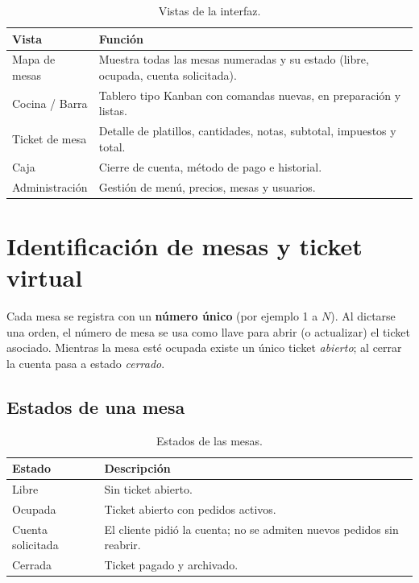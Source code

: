 \documentclass[11pt,letterpaper]{article}
\newcommand{\tabhead}[1]{\textbf{\color{white}#1}}
\newcommand{\encabezado}{\rowcolor{azulprincipal}}
\begin{document}
\begin{table}[h!]
\centering
\begin{tabularx}{\textwidth}{l X}
\toprule
\encabezado \tabhead{Vista} & \tabhead{Función} \\
\midrule
Mapa de mesas & Muestra todas las mesas numeradas y su estado (libre, ocupada, cuenta solicitada). \\
Cocina / Barra & Tablero tipo Kanban con comandas nuevas, en preparación y listas. \\
Ticket de mesa & Detalle de platillos, cantidades, notas, subtotal, impuestos y total. \\
Caja & Cierre de cuenta, método de pago e historial. \\
Administración & Gestión de menú, precios, mesas y usuarios. \\
\bottomrule
\end{tabularx}
\caption{Vistas de la interfaz.}
\end{table}

\section{Identificación de mesas y ticket virtual}
Cada mesa se registra con un \textbf{número único} (por ejemplo 1 a $N$). Al dictarse una orden, el número de mesa se usa como llave para abrir (o actualizar) el ticket asociado. Mientras la mesa esté ocupada existe un único ticket \textit{abierto}; al cerrar la cuenta pasa a estado \textit{cerrado}.

\subsection{Estados de una mesa}
\begin{table}[h!]
\centering
\begin{tabular}{@{}lp{9cm}@{}}
\toprule
\encabezado \tabhead{Estado} & \tabhead{Descripción} \\
\midrule
Libre & Sin ticket abierto. \\
Ocupada & Ticket abierto con pedidos activos. \\
Cuenta solicitada & El cliente pidió la cuenta; no se admiten nuevos pedidos sin reabrir. \\
Cerrada & Ticket pagado y archivado. \\
\bottomrule
\end{tabular}
\caption{Estados de las mesas.}
\end{table}
\end{document}

